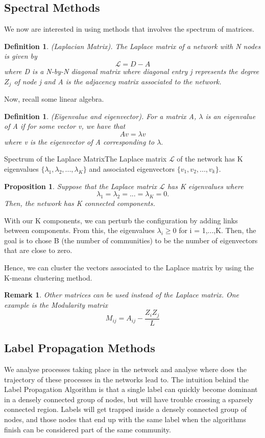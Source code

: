 \documentclass[twoside]{article}
\newtheorem{proposition}[theorem]{Proposition}
\newtheorem{definition}[theorem]{Definition}
\newtheorem{remark}[theorem]{Remark}
\begin{document}
\subsection{Spectral Methods}
We now are interested in using methods that involves the spectrum of matrices.

\begin{definition}(Laplacian Matrix). The Laplace matrix of a network with N nodes is given by
$$
\mathcal{L} = D - A
$$
where D is a N-by-N diagonal matrix where diagonal entry j represents the degree $Z_j$ of node j and A is the adjacency matrix associated to the network.
\end{definition}

Now, recall some linear algebra.
\begin{definition}(Eigenvalue and eigenvector). For a matrix A, $\lambda$ is an eigenvalue of A if for some vector v, we have that 
$$
A v = \lambda v
$$
where v is the eigenvector of A corresponding to $\lambda.$
\end{definition}

\begin{theorem_exam}{Spectrum of the Laplace Matrix}{}The Laplace matrix $\mathcal{L}$ of the network has K eigenvalues $\{\lambda_1, \lambda_2, ..., \lambda_K\}$ and associated eigenvectors $\{v_1, v_2, ..., v_k\}$.
\end{theorem_exam}

\begin{proposition}Suppose that the Laplace matrix $\mathcal{L}$ has K eigenvalues where 
$$
\lambda_1 = \lambda_2 = ... = \lambda_K = 0.
$$
Then, the network has K connected components.
\end{proposition}

With our K components, we can perturb the configuration by adding links between components. From this, the eigenvalues $\lambda_i \geq 0$ for i = 1,...,K. Then, the goal is to chose B (the number of communities) to be the number of eigenvectors that are close to zero.

Hence, we can cluster the vectors associated to the Laplace matrix by using the K-means clustering method.

\begin{remark}Other matrices can be used instead of the Laplace matrix. One example is the Modularity matrix 
$$
M_{ij} = A_{ij} - \frac{Z_iZ_j}{L}
$$
\end{remark}

\subsection{Label Propagation Methods}
We analyse processes taking place in the network and analyse where does the trajectory of these processes in the networks lead to. The intuition behind the Label Propagation Algorithm is that a single label can quickly become dominant in a densely connected group of nodes, but will have trouble crossing a sparsely connected region. Labels will get trapped inside a densely connected group of nodes, and those nodes that end up with the same label when the algorithms finish can be considered part of the same community.
\end{document}

